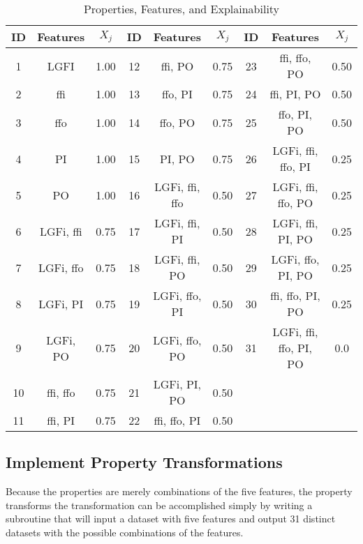 \begin{table}[H]
    \renewcommand{\arraystretch}{1.3}
    \caption{Properties, Features, and Explainability}
    \begin{center}
    \begin{tabular}{|c|c|c||c|c|c||c|c|c|}
        \hline
        \bfseries ID & \bfseries Features & \bfseries $X_j$ & \bfseries ID & \bfseries Features & \bfseries $X_j$ & \bfseries ID & \bfseries Features & \bfseries $X_j$ \\
        \hline
        \hline
        1 & LGFI & 1.00 & 12 & ffi, PO & 0.75 & 23 & ffi, ffo, PO & 0.50 \\
        \hline
        2 & ffi & 1.00 & 13 & ffo, PI  & 0.75 & 24 & ffi, PI, PO & 0.50 \\
        \hline
        3 & ffo & 1.00 & 14 & ffo, PO & 0.75 & 25 & ffo, PI, PO & 0.50 \\
        \hline
        4 & PI & 1.00 & 15 & PI, PO & 0.75 & 26 & LGFi, ffi, ffo, PI & 0.25 \\
        \hline
        5 & PO & 1.00 & 16 & LGFi, ffi, ffo & 0.50 & 27 & LGFi, ffi, ffo, PO & 0.25 \\
        \hline
        6 & LGFi, ffi & 0.75 & 17 &  LGFi, ffi, PI & 0.50 & 28 & LGFi, ffi, PI, PO & 0.25 \\
        \hline
        7 & LGFi, ffo & 0.75 & 18 & LGFi, ffi, PO & 0.50 & 29 & LGFi, ffo, PI, PO & 0.25 \\
        \hline
        8 & LGFi, PI & 0.75 & 19 & LGFi, ffo, PI & 0.50 & 30 & ffi, ffo, PI, PO & 0.25 \\
        \hline
        9 & LGFi, PO & 0.75 & 20 & LGFi, ffo, PO & 0.50 & 31 & LGFi, ffi, ffo, PI, PO & 0.0\\
        \hline
        10 & ffi, ffo & 0.75 & 21 & LGFi, PI, PO & 0.50 \\
        \cline{0-5}
        11 & ffi, PI & 0.75 & 22 & ffi, ffo, PI & 0.50 \\
        \cline{0-5}
    \end{tabular}
    \end{center}
    \label{tab_prop_id}
\end{table}

\subsection{Implement Property Transformations}

Because the properties are merely combinations of the five features, the
property transforms the transformation can be accomplished simply by writing a
subroutine that will input a dataset with five features and output 31 distinct
datasets with the possible combinations of the features.

